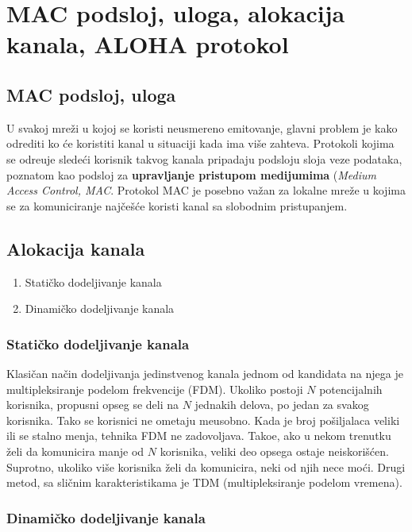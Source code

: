 \documentclass{article} %
\begin{document}
\section{MAC podsloj, uloga, alokacija kanala, ALOHA protokol}

\subsection{MAC podsloj, uloga}

U svakoj mre\v{z}i u kojoj se koristi neusmereno emitovanje, glavni problem je kako odrediti ko \'{c}e koristiti kanal u situaciji kada ima vi\v{s}e zahteva. Protokoli kojima se odre\dj{}uje slede\'{c}i korisnik takvog kanala pripadaju podsloju sloja veze podataka, poznatom kao podsloj za \textbf{upravljanje pristupom medijumima} (\textit{Medium Access Control, MAC}. Protokol MAC je posebno va\v{z}an za lokalne mre\v{z}e u kojima se za komuniciranje naj\v{c}e\v{s}\'{c}e koristi kanal sa slobodnim pristupanjem.

\subsection{Alokacija kanala}

\begin{enumerate}
	\item Stati\v{c}ko dodeljivanje kanala
	\item Dinami\v{c}ko dodeljivanje kanala
\end{enumerate}

\subsubsection{Stati\v{c}ko dodeljivanje kanala}

Klasi\v{c}an na\v{c}in dodeljivanja jedinstvenog kanala jednom od kandidata na njega je multipleksiranje podelom frekvencije (FDM). Ukoliko postoji $N$ potencijalnih korisnika, propusni opseg se deli na $N$ jednakih delova, po jedan za svakog korisnika. Tako se korisnici ne ometaju me\dj{}usobno. Kada je broj po\v{s}iljalaca veliki ili se stalno menja, tehnika FDM ne zadovoljava. Tako\dj{}e, ako u nekom trenutku \v{z}eli da komunicira manje od $N$ korisnika, veliki deo opsega ostaje neiskori\v{s}\'{c}en. Suprotno, ukoliko vi\v{s}e korisnika \v{z}eli da komunicira, neki od njih nece mo\'{c}i. Drugi metod, sa sli\v{c}nim karakteristikama je TDM (multipleksiranje podelom vremena).

\subsubsection{Dinami\v{c}ko dodeljivanje kanala}
\end{document}
